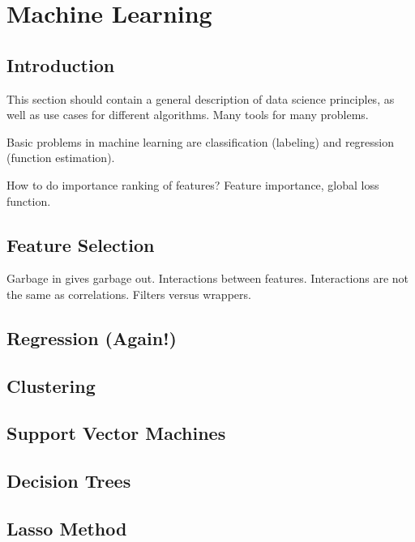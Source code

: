 \section{Machine Learning}

\subsection{Introduction}

This section should contain a general description of data science principles, as well as use cases for different algorithms. Many tools for many problems. 

Basic problems in machine learning are classification (labeling) and regression (function estimation). 

How to do importance ranking of features? Feature importance, global loss function.

\subsection{Feature Selection}

Garbage in gives garbage out. 
Interactions between features. Interactions are not the same as correlations.
Filters versus wrappers.

\subsection{Regression (Again!)}

\subsection{Clustering}

\subsection{Support Vector Machines}

\subsection{Decision Trees}

\subsection{Lasso Method}
